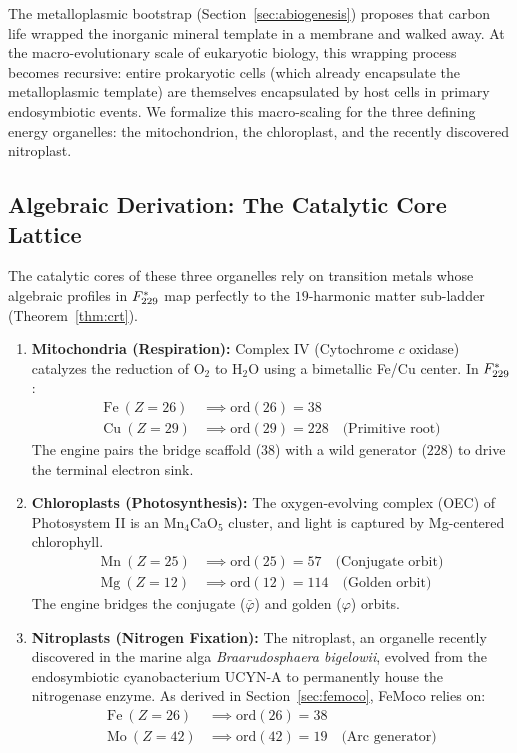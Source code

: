 The metalloplasmic bootstrap (Section~\ref{sec:abiogenesis}) proposes that carbon life wrapped the inorganic mineral template in a membrane and walked away. At the macro-evolutionary scale of eukaryotic biology, this wrapping process becomes recursive: entire prokaryotic cells (which already encapsulate the metalloplasmic template) are themselves encapsulated by host cells in primary endosymbiotic events. We formalize this macro-scaling for the three defining energy organelles: the mitochondrion, the chloroplast, and the recently discovered nitroplast.

\subsection{Algebraic Derivation: The Catalytic Core Lattice}

The catalytic cores of these three organelles rely on transition metals whose algebraic profiles in $F_{229}^*$ map perfectly to the $19$-harmonic matter sub-ladder (Theorem~\ref{thm:crt}).

\begin{enumerate}
    \item \textbf{Mitochondria (Respiration):} Complex IV (Cytochrome $c$ oxidase) catalyzes the reduction of O$_2$ to H$_2$O using a bimetallic Fe/Cu center. In $F_{229}^*$:
    \begin{align*}
    \text{Fe} \ (Z=26) &\implies \mathrm{ord}(26) = 38 \\
    \text{Cu} \ (Z=29) &\implies \mathrm{ord}(29) = 228 \quad \text{(Primitive root)}
    \end{align*}
    The engine pairs the bridge scaffold ($38$) with a wild generator ($228$) to drive the terminal electron sink.

    \item \textbf{Chloroplasts (Photosynthesis):} The oxygen-evolving complex (OEC) of Photosystem II is an Mn$_4$CaO$_5$ cluster, and light is captured by Mg-centered chlorophyll.
    \begin{align*}
    \text{Mn} \ (Z=25) &\implies \mathrm{ord}(25) = 57 \quad \text{(Conjugate orbit)} \\
    \text{Mg} \ (Z=12) &\implies \mathrm{ord}(12) = 114 \quad \text{(Golden orbit)}
    \end{align*}
    The engine bridges the conjugate ($\bar\varphi$) and golden ($\varphi$) orbits.

    \item \textbf{Nitroplasts (Nitrogen Fixation):} The nitroplast, an organelle recently discovered in the marine alga \textit{Braarudosphaera bigelowii}, evolved from the endosymbiotic cyanobacterium UCYN-A to permanently house the nitrogenase enzyme. As derived in Section~\ref{sec:femoco}, FeMoco relies on:
    \begin{align*}
    \text{Fe} \ (Z=26) &\implies \mathrm{ord}(26) = 38 \\
    \text{Mo} \ (Z=42) &\implies \mathrm{ord}(42) = 19 \quad \text{(Arc generator)}
    \end{align*}
\end{enumerate}

